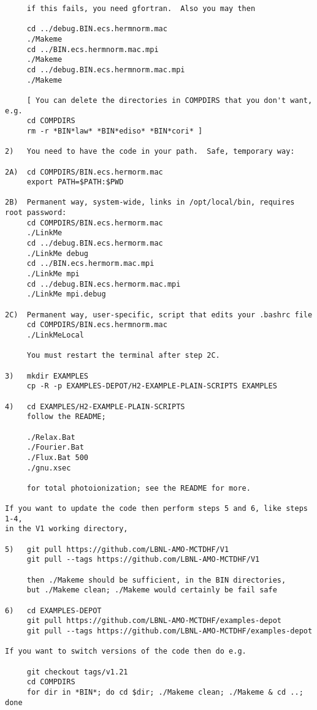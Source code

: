 \begin{verbatim}
     if this fails, you need gfortran.  Also you may then

     cd ../debug.BIN.ecs.hermnorm.mac
     ./Makeme
     cd ../BIN.ecs.hermnorm.mac.mpi
     ./Makeme
     cd ../debug.BIN.ecs.hermnorm.mac.mpi
     ./Makeme

     [ You can delete the directories in COMPDIRS that you don't want, e.g.
     cd COMPDIRS
     rm -r *BIN*law* *BIN*ediso* *BIN*cori* ]

2)   You need to have the code in your path.  Safe, temporary way:

2A)  cd COMPDIRS/BIN.ecs.hermorm.mac
     export PATH=$PATH:$PWD

2B)  Permanent way, system-wide, links in /opt/local/bin, requires root password:
     cd COMPDIRS/BIN.ecs.hermorm.mac
     ./LinkMe
     cd ../debug.BIN.ecs.hermorm.mac
     ./LinkMe debug
     cd ../BIN.ecs.hermorm.mac.mpi
     ./LinkMe mpi
     cd ../debug.BIN.ecs.hermorm.mac.mpi
     ./LinkMe mpi.debug

2C)  Permanent way, user-specific, script that edits your .bashrc file
     cd COMPDIRS/BIN.ecs.hermnorm.mac
     ./LinkMeLocal

     You must restart the terminal after step 2C.

3)   mkdir EXAMPLES
     cp -R -p EXAMPLES-DEPOT/H2-EXAMPLE-PLAIN-SCRIPTS EXAMPLES

4)   cd EXAMPLES/H2-EXAMPLE-PLAIN-SCRIPTS
     follow the README; 

     ./Relax.Bat
     ./Fourier.Bat 
     ./Flux.Bat 500
     ./gnu.xsec

     for total photoionization; see the README for more.
 
If you want to update the code then perform steps 5 and 6, like steps 1-4, 
in the V1 working directory,

5)   git pull https://github.com/LBNL-AMO-MCTDHF/V1
     git pull --tags https://github.com/LBNL-AMO-MCTDHF/V1

     then ./Makeme should be sufficient, in the BIN directories,
     but ./Makeme clean; ./Makeme would certainly be fail safe

6)   cd EXAMPLES-DEPOT
     git pull https://github.com/LBNL-AMO-MCTDHF/examples-depot
     git pull --tags https://github.com/LBNL-AMO-MCTDHF/examples-depot

If you want to switch versions of the code then do e.g.

     git checkout tags/v1.21
     cd COMPDIRS
     for dir in *BIN*; do cd $dir; ./Makeme clean; ./Makeme & cd ..; done


\end{verbatim}
